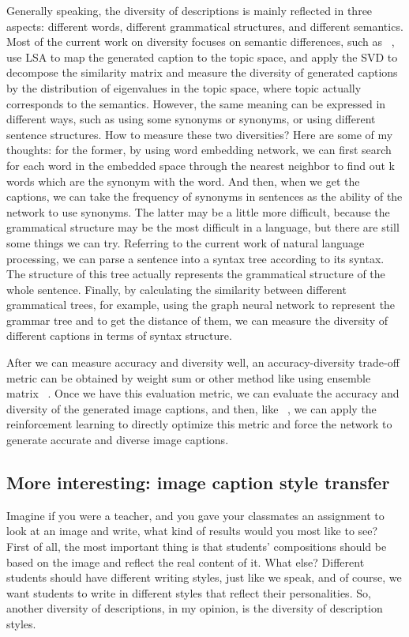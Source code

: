 \documentclass[12pt]{article}
\begin{document}
	Generally speaking, the diversity of descriptions is mainly reflected in three aspects: different words, different grammatical structures, and different semantics. Most of the current work on diversity focuses on semantic differences, such as ~\cite{wang2019describing}, use LSA to map the generated caption to the topic space, and apply the SVD to decompose the similarity matrix and measure the diversity of generated captions by the distribution of eigenvalues in the topic space, where topic actually corresponds to the semantics. However, the same meaning can be expressed in different ways, such as using some synonyms or synonyms, or using different sentence structures. How to measure these two diversities? Here are some of my thoughts: for the former, by using word embedding network, we can first search for each word in the embedded space through the nearest neighbor to find out k words which are the synonym with the word. And then, when we get the captions, we can take the frequency of synonyms in sentences as the ability of the network to use synonyms. The latter may be a little more difficult, because the grammatical structure may be the most difficult in a language, but there are still some things we can try. Referring to the current work of natural language processing, we can parse a sentence into a syntax tree according to its syntax. The structure of this tree actually represents the grammatical structure of the whole sentence. Finally, by calculating the similarity between different grammatical trees, for example, using the graph neural network to represent the grammar tree and to get the distance of them, we can measure the diversity of different captions in terms of syntax structure.  \par
	After we can measure accuracy and diversity well, an accuracy-diversity trade-off metric can be obtained by weight sum or other method like using ensemble matrix ~\cite{wang2020diversity}. Once we have this evaluation metric, we can evaluate the accuracy and diversity of the generated image captions, and then, like ~\cite{rennie2017self}, we can apply the reinforcement learning to directly optimize this metric and force the network to generate accurate and diverse image captions.
	\subsection{More interesting: image caption style transfer}
	Imagine if you were a teacher, and you gave your classmates an assignment to look at an image and write, what kind of results would you most like to see? First of all, the most important thing is that students' compositions should be based on the image and reflect the real content of it. What else? Different students should have different writing styles, just like we speak, and of course, we want students to write in different styles that reflect their personalities. So, another diversity of descriptions, in my opinion, is the diversity of description styles.  \par
	
\end{document}
